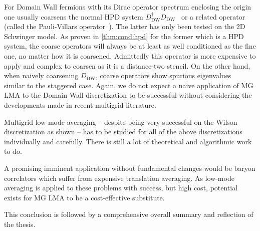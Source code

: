 For Domain Wall fermions with its Dirac operator spectrum enclosing the origin one usually coarsens the normal HPD system $D_{\text{DW}}^{\dagger} D_{\text{DW}}$~\cite{Cohen:2011ivh,Boyle:2014rwa} or a related operator (called the Pauli-Villars operator~\cite{Brower:2020xmc}).
The latter has only been tested on the 2D Schwinger model.
As proven in \cref{thm:cond:hpd} for the former which is a HPD system, the coarse operators will always be at least as well conditioned as the fine one, no matter how it is coarsened.
Admittedly this operator is more expensive to apply and complex to coarsen as it is a distance-two stencil.
On the other hand, when naively coarsening $D_{\text{DW}}$, coarse operators show spurious eigenvalues~\cite{Brower:2020xmc} similar to the staggered case.
Again, we do not expect a naive application of MG LMA to the Domain Wall discretization to be successful without considering the developments made in recent multigrid literature.

Multigrid low-mode averaging -- despite being very successful on the Wilson discretization as shown -- has to be studied for all of the above discretizations individually and carefully.
There is still a lot of theoretical and algorithmic work to do.

A promising imminent application without fundamental changes would be baryon correlators which suffer from expensive translation averaging.
As low-mode averaging is applied to these problems with success, but high cost, potential exists for MG LMA to be a cost-effective substitute.

This conclusion is followed by a comprehensive overall summary and reflection of the thesis.


